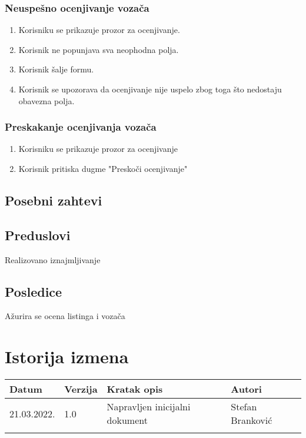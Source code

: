 \documentclass[12pt]{article}
\begin{document}
\subsubsection{Neuspešno ocenjivanje vozača}
\begin{enumerate}
  \item Korisniku se prikazuje prozor za ocenjivanje.
  \item Korisnik ne popunjava sva neophodna polja.
  \item Korisnik šalje formu.
  \item Korisnik se upozorava da ocenjivanje nije uspelo zbog toga što nedostaju obavezna polja.
\end{enumerate}

\subsubsection{Preskakanje ocenjivanja vozača}
\begin{enumerate}
  \item Korisniku se prikazuje prozor za ocenjivanje
  \item Korisnik pritiska dugme "Preskoči ocenjivanje"
\end{enumerate}

\subsection{Posebni zahtevi}
\subsection{Preduslovi}
Realizovano iznajmljivanje
\subsection{Posledice}
Ažurira se ocena listinga i vozača
\section{Istorija izmena}
\begin{center}
\begin{tabular}{ | m{2cm} | m{1.5cm}| m{6cm} | m{5cm} | } 
\hline
Datum & Verzija & Kratak opis & Autori \\ 
\hline
 21.03.2022. & 1.0 & Napravljen inicijalni dokument & Stefan Branković\\ 
\hline
&&&\\ 
\hline
\end{tabular}
\end{center}
\end{document}

